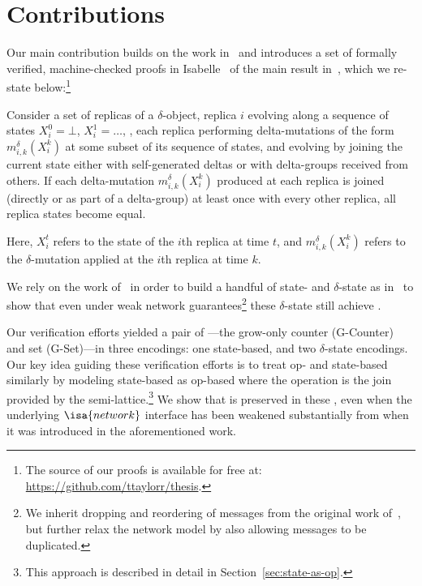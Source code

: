 \section{Contributions}

Our main contribution builds on the work in~\citet{gomes17} and introduces a set
of formally verified, machine-checked proofs in Isabelle~\citep{wenzel02} of the
main result in~\citet{almedia18}, which we re-state below:\footnote{The source
of our proofs is available for free at:
\url{https://github.com/ttaylorr/thesis}.}

\begin{theorem}
  Consider a set of replicas of a $\delta$-\CRDT object, replica $i$ evolving
  along a sequence of states $X_i^0 = \bot$, $X_i^1=\ldots$, , each replica
  performing delta-mutations of the form $m^\delta_{i,k}(X^k_i)$ at some subset
  of its sequence of states, and evolving by joining the current state either
  with self-generated deltas or with delta-groups received from others. If each
  delta-mutation $m^\delta _{i,k}(X^k_i)$ produced at each replica is joined
  (directly or as part of a delta-group) at least once with every other replica,
  all replica states become equal.
\end{theorem}

Here, $X_i^t$ refers to the state of the $i$th replica at time $t$, and
$m^\delta_{i,k}(X_i^k)$ refers to the $\delta$-mutation applied at the $i$th
replica at time $k$.

We rely on the work of~\citet{gomes17} in order to build a handful of state- and
$\delta$-state \CRDTs as in~\citet{almedia18} to show that even under weak
network guarantees\footnote{We inherit dropping and reordering of messages from
the original work of~\citet{gomes17}, but further relax the network model by
also allowing messages to be duplicated.} these $\delta$-state \CRDTs still
achieve \SEC.

Our verification efforts yielded a pair of \CRDTs---the grow-only counter
(G-Counter) and set (G-Set)---in three encodings: one state-based, and two
$\delta$-state encodings. Our key idea guiding these verification efforts is to
treat op- and state-based \CRDTs similarly by modeling state-based \CRDTs as
op-based where the operation is the join provided by the
semi-lattice.\footnote{This approach is described in detail in
Section~\ref{sec:state-as-op}.} We show that \SEC is preserved in these \CRDTs,
even when the underlying $\isa{network}$ interface has been weakened
substantially from when it was introduced in the aforementioned work.

